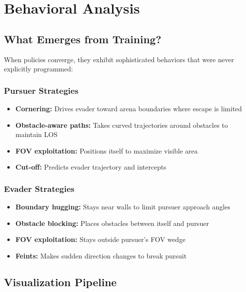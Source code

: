 \documentclass[11pt,a4paper]{report}
\begin{document}
\chapter{Behavioral Analysis}
\label{chap:behavior}

\section{What Emerges from Training?}

When policies converge, they exhibit sophisticated behaviors that were never explicitly programmed:

\subsection{Pursuer Strategies}
\begin{itemize}
    \item \textbf{Cornering:} Drives evader toward arena boundaries where escape is limited
    \item \textbf{Obstacle-aware paths:} Takes curved trajectories around obstacles to maintain LOS
    \item \textbf{FOV exploitation:} Positions itself to maximize visible area
    \item \textbf{Cut-off:} Predicts evader trajectory and intercepts
\end{itemize}

\subsection{Evader Strategies}
\begin{itemize}
    \item \textbf{Boundary hugging:} Stays near walls to limit pursuer approach angles
    \item \textbf{Obstacle blocking:} Places obstacles between itself and pursuer
    \item \textbf{FOV exploitation:} Stays outside pursuer's FOV wedge
    \item \textbf{Feints:} Makes sudden direction changes to break pursuit
\end{itemize}

\section{Visualization Pipeline}
\end{document}
